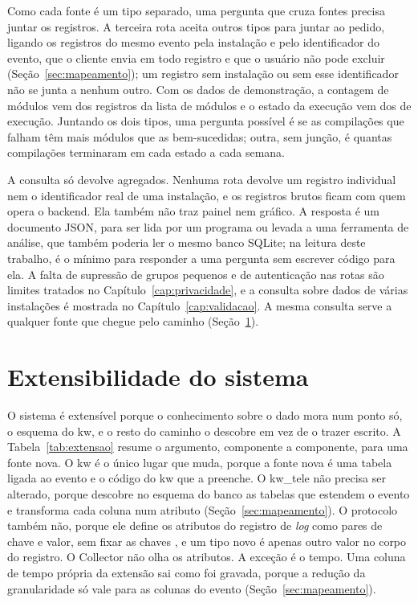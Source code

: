 Como cada fonte é um tipo separado, uma pergunta que cruza fontes precisa
juntar os registros. A terceira rota aceita outros tipos para juntar ao
pedido, ligando os registros do mesmo evento pela instalação e pelo identificador do
evento, que o cliente envia em todo registro e que o usuário não pode excluir
(Seção~\ref{sec:mapeamento}); um registro sem instalação ou sem esse
identificador não se junta a nenhum outro.
Com os dados de demonstração, a contagem de módulos vem dos registros da lista
de módulos e o estado da execução vem dos de execução. Juntando os dois tipos,
uma pergunta possível é se as compilações que falham têm mais módulos que as
bem-sucedidas; outra, sem junção, é quantas compilações terminaram em cada
estado a cada semana.

A consulta só devolve agregados. Nenhuma rota devolve um registro individual
nem o identificador real de uma instalação, e os registros brutos ficam com
quem opera o backend. Ela também não traz painel nem gráfico. A resposta é um documento JSON, para
ser lida por um programa ou levada a uma ferramenta de análise, que também
poderia ler o mesmo banco SQLite; na leitura deste trabalho, é o mínimo para
responder a uma pergunta sem escrever código para ela. A falta de supressão de
grupos pequenos e de autenticação nas rotas são limites tratados no
Capítulo~\ref{cap:privacidade}, e a consulta sobre dados de várias
instalações é mostrada no Capítulo~\ref{cap:validacao}. A mesma consulta serve
a qualquer fonte que chegue pelo caminho (Seção~\ref{sec:extensibilidade}).

\section{Extensibilidade do sistema}
\label{sec:extensibilidade}

O sistema é extensível porque o conhecimento sobre o dado mora num ponto só, o
esquema do kw, e o resto do caminho o descobre em vez de o trazer escrito. A
Tabela~\ref{tab:extensao} resume o argumento, componente a componente, para uma
fonte nova. O kw é o único lugar que muda, porque a fonte nova é uma tabela ligada ao
evento e o código do kw que a preenche. O kw\_tele não precisa ser alterado,
porque descobre no esquema do banco as tabelas que estendem o evento e
transforma cada coluna num atributo (Seção~\ref{sec:mapeamento}). O protocolo
também não, porque ele define os atributos do registro de \textit{log} como
pares de chave e valor, sem fixar as chaves
\citep{otel_common_spec_v1_63_0,otlp_spec_1_11_1}, e um tipo novo é apenas
outro valor no corpo do registro. O Collector não olha os atributos. A exceção é o tempo. Uma coluna de tempo própria da extensão sai como foi
gravada, porque a redução da granularidade só vale para as colunas do evento
(Seção~\ref{sec:mapeamento}).


